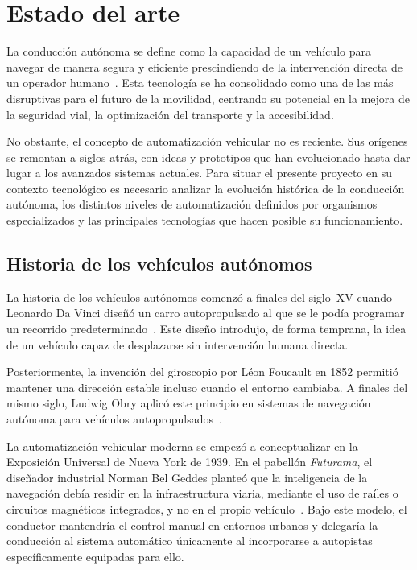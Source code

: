 \chapter{Estado del arte}
\label{ch:estado-del-arte}

La conducción autónoma se define como la capacidad de un vehículo para
navegar de manera segura y eficiente prescindiendo de la intervención
directa de un operador humano~\cite{ita_deteccion}. Esta tecnología se
ha consolidado como una de las más disruptivas para el futuro de la
movilidad, centrando su potencial en la mejora de la seguridad vial, la
optimización del transporte y la accesibilidad.

No obstante, el concepto de automatización vehicular no es reciente.
Sus orígenes se remontan a siglos atrás, con ideas y prototipos que han
evolucionado hasta dar lugar a los avanzados sistemas actuales. Para
situar el presente proyecto en su contexto tecnológico es necesario
analizar la evolución histórica de la conducción autónoma, los
distintos niveles de automatización definidos por organismos
especializados y las principales tecnologías que hacen posible su
funcionamiento.

\section{Historia de los vehículos autónomos}
\label{sec:historia-va}

La historia de los vehículos autónomos comenzó a finales del siglo~XV
cuando Leonardo Da Vinci diseñó un carro autopropulsado al que se le
podía programar un recorrido predeterminado~\cite{motorpedia_historia}.
Este diseño introdujo, de forma temprana, la idea de un vehículo capaz
de desplazarse sin intervención humana directa.

Posteriormente, la invención del giroscopio por Léon Foucault en 1852
permitió mantener una dirección estable incluso cuando el entorno
cambiaba. A finales del mismo siglo, Ludwig Obry aplicó este principio
en sistemas de navegación autónoma para vehículos
autopropulsados~\cite{prensa_conduccion}.

La automatización vehicular moderna se empezó a conceptualizar en la
Exposición Universal de Nueva York de 1939. En el pabellón
\textit{Futurama}, el diseñador industrial Norman Bel Geddes planteó
que la inteligencia de la navegación debía residir en la
infraestructura viaria, mediante el uso de raíles o circuitos
magnéticos integrados, y no en el propio
vehículo~\cite{geddes1940magic}. Bajo este modelo, el conductor
mantendría el control manual en entornos urbanos y delegaría la
conducción al sistema automático únicamente al incorporarse a
autopistas específicamente equipadas para ello.

